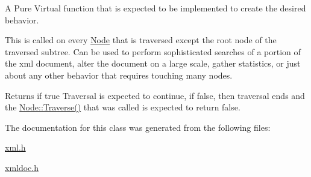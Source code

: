 A Pure Virtual function that is expected to be implemented to create the desired behavior. 

This is called on every \hyperlink{classphys_1_1xml_1_1Node}{Node} that is traversed except the root node of the traversed subtree. Can be used to perform sophisticated searches of a portion of the xml document, alter the document on a large scale, gather statistics, or just about any other behavior that requires touching many nodes. \begin{DoxyReturn}{Returns}
if true Traversal is expected to continue, if false, then traversal ends and the \hyperlink{classphys_1_1xml_1_1Node_a0029d08d3689c36d882ada0c0c9cf6e9}{Node::Traverse()} that was called is expected to return false. 
\end{DoxyReturn}


The documentation for this class was generated from the following files:\begin{DoxyCompactItemize}
\item 
\hyperlink{xml_8h}{xml.h}\item 
\hyperlink{xmldoc_8h}{xmldoc.h}\end{DoxyCompactItemize}
